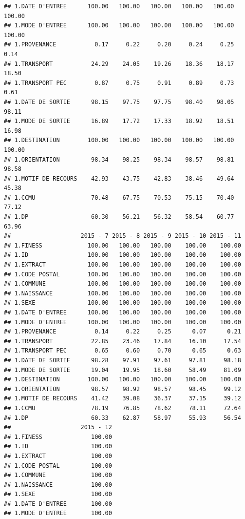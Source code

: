 \documentclass[]{article}
\begin{document}
\begin{verbatim}
## 1.DATE D'ENTREE      100.00   100.00   100.00   100.00   100.00   100.00
## 1.MODE D'ENTREE      100.00   100.00   100.00   100.00   100.00   100.00
## 1.PROVENANCE           0.17     0.22     0.20     0.24     0.25     0.14
## 1.TRANSPORT           24.29    24.05    19.26    18.36    18.17    18.50
## 1.TRANSPORT PEC        0.87     0.75     0.91     0.89     0.73     0.61
## 1.DATE DE SORTIE      98.15    97.75    97.75    98.40    98.05    98.11
## 1.MODE DE SORTIE      16.89    17.72    17.33    18.92    18.51    16.98
## 1.DESTINATION        100.00   100.00   100.00   100.00   100.00   100.00
## 1.ORIENTATION         98.34    98.25    98.34    98.57    98.81    98.58
## 1.MOTIF DE RECOURS    42.93    43.75    42.83    38.46    49.64    45.38
## 1.CCMU                70.48    67.75    70.53    75.15    70.40    77.12
## 1.DP                  60.30    56.21    56.32    58.54    60.77    63.96
##                    2015 - 7 2015 - 8 2015 - 9 2015 - 10 2015 - 11
## 1.FINESS             100.00   100.00   100.00    100.00    100.00
## 1.ID                 100.00   100.00   100.00    100.00    100.00
## 1.EXTRACT            100.00   100.00   100.00    100.00    100.00
## 1.CODE POSTAL        100.00   100.00   100.00    100.00    100.00
## 1.COMMUNE            100.00   100.00   100.00    100.00    100.00
## 1.NAISSANCE          100.00   100.00   100.00    100.00    100.00
## 1.SEXE               100.00   100.00   100.00    100.00    100.00
## 1.DATE D'ENTREE      100.00   100.00   100.00    100.00    100.00
## 1.MODE D'ENTREE      100.00   100.00   100.00    100.00    100.00
## 1.PROVENANCE           0.14     0.22     0.25      0.07      0.21
## 1.TRANSPORT           22.85    23.46    17.84     16.10     17.54
## 1.TRANSPORT PEC        0.65     0.60     0.70      0.65      0.63
## 1.DATE DE SORTIE      98.28    97.91    97.61     97.81     98.18
## 1.MODE DE SORTIE      19.04    19.95    18.60     58.49     81.09
## 1.DESTINATION        100.00   100.00   100.00    100.00    100.00
## 1.ORIENTATION         98.57    98.92    98.57     98.45     99.12
## 1.MOTIF DE RECOURS    41.42    39.08    36.37     37.15     39.12
## 1.CCMU                78.19    76.85    78.62     78.11     72.64
## 1.DP                  60.33    62.87    58.97     55.93     56.54
##                    2015 - 12
## 1.FINESS              100.00
## 1.ID                  100.00
## 1.EXTRACT             100.00
## 1.CODE POSTAL         100.00
## 1.COMMUNE             100.00
## 1.NAISSANCE           100.00
## 1.SEXE                100.00
## 1.DATE D'ENTREE       100.00
## 1.MODE D'ENTREE       100.00

\end{verbatim}
\end{document}
